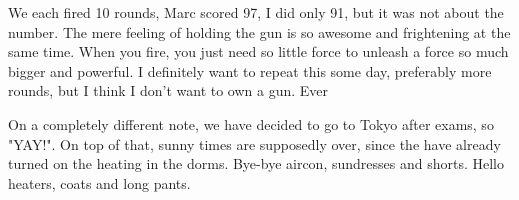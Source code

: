 \begin{post}
\begin{content}
We each fired 10 rounds, Marc scored 97, I did only 91, but it was not about the number. The mere feeling of holding the gun is so awesome and frightening at the same time. When you fire, you just need so little force to unleash a force so much bigger and powerful. I definitely want to repeat this some day, preferably more rounds, but I think I don't want to own a gun. Ever

On a completely different note, we have decided to go to Tokyo after exams, so "YAY!". On top of that, sunny times are supposedly over, since the have already turned on the heating in the dorms. Bye-bye aircon, sundresses and shorts. Hello heaters, coats and long pants.
	\end{content}
\end{post}
